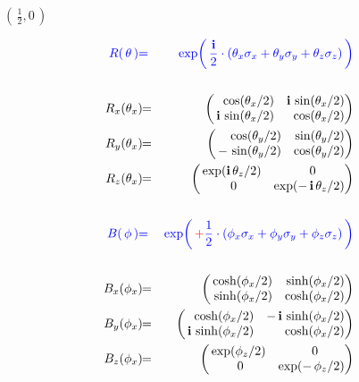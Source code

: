 \begin{frame}{\headingColor\bf\LARGE}

\scriptsize

\begin{multicols}{2}

	\begin{minipage}{7cm}
	\begin{center}
	\vskip -1cm
	\textbf{\Large$\left(\,\frac{1}{2},0\,\right)$}
	\end{center}
	\vskip -0.3cm
	\begin{eqnarray*}
	{\color{blue}R(\,\mathbf{\theta}\,)}
	& {\color{blue}=} &
		{\color{blue}\exp\!\left(\,\frac{\i}{2}\cdot(\theta_{x}\sigma_{x}+\theta_{y}\sigma_{y}+\theta_{z}\sigma_{z})\,\right)}
	\\ \\
	R_{x}(\theta_{x})\!\!
	& = &
		\!\!\left(\!\!\begin{array}{rr} \cos(\theta_{x}/2) & \i\,\sin(\theta_{x}/2) \\ \i\,\sin(\theta_{x}/2) & \cos(\theta_{x}/2) \end{array}\!\!\!\right)
	\\
	R_{y}(\theta_{x})\!\!
	& = &
		\!\!\left(\!\!\begin{array}{rr} \cos(\theta_{y}/2) & \sin(\theta_{y}/2) \\ -\,\sin(\theta_{y}/2) & \cos(\theta_{y}/2) \end{array}\!\!\!\right)
	\\
	R_{z}(\theta_{x})\!\!
	& = &
		\!\!\left(\!\!\begin{array}{cc} \exp(\i\,\theta_{z}/2) & {\color{white}..}0 \\ {\color{white}.}0 & \exp(-\,\i\,\theta_{z}/2) \end{array}\!\!\!\right)
	\\ \\
	{\color{blue}B(\,\mathbf{\phi}\,)}
	& {\color{blue}=} &
		{\color{blue}\exp\!\left(\,{\color{red}+}\frac{1}{2}\cdot(\phi_{x}\sigma_{x}+\phi_{y}\sigma_{y}+\phi_{z}\sigma_{z})\,\right)}
	\\ \\
	B_{x}(\phi_{x})\!\!
	& = &
		\!\!\left(\!\!\begin{array}{rr} \cosh(\phi_{x}/2) & \sinh(\phi_{x}/2) \\ \sinh(\phi_{x}/2) & \cosh(\phi_{x}/2) \end{array}\!\!\!\right)
	\\
	B_{y}(\phi_{x})\!\!
	& = &
		\!\!\left(\!\!\begin{array}{rr} \cosh(\phi_{x}/2) & -\,\i\,\sinh(\phi_{x}/2) \\ \i\,\sinh(\phi_{x}/2) & \cosh(\phi_{x}/2) \end{array}\!\!\!\right)
	\\
	B_{z}(\phi_{x})\!\!
	&=&
		\!\!\left(\!\!\begin{array}{cc} \exp(\phi_{z}/2) & {\color{white}..}0 \\ {\color{white}.}0 & \exp(-\,\phi_{z}/2) \end{array}\!\!\!\right)
	\end{eqnarray*}
	\end{minipage}


\end{multicols}
\end{frame}
